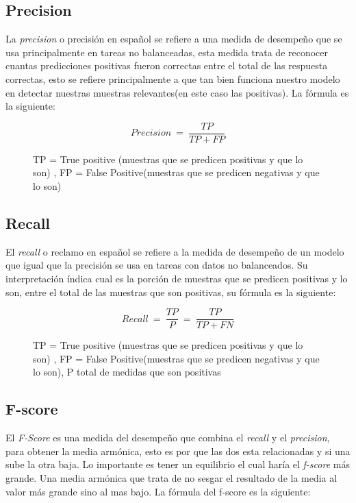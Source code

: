 \subsection{Precision}
	
\par La \textit{precision} o precisión en español se refiere a una medida de desempeño que se usa principalmente en tareas no balanceadas, esta medida trata de reconocer cuantas predicciones positivas fueron correctas entre el total de las respuesta correctas, esto se refiere principalmente a que tan bien funciona nuestro modelo en detectar nuestras muestras relevantes(en este caso las positivas). La fórmula es la siguiente: 
\begin{figure}[H]
    \centering
    \begin{equation*}
        Precision\ =\ \frac{TP}{TP+FP}    
    \end{equation*}
        \caption*{TP = True positive (muestras que se predicen positivas y que lo son) , FP = False Positive(muestras que se predicen negativas y que lo son)}
\end{figure}


\subsection{Recall}

\par El \textit{recall} o reclamo en español se refiere a la medida de desempeño de un modelo que igual que la precisión se usa en tareas con datos no balanceados. Su interpretación índica cual es la porción de muestras que se predicen positivas y lo son, entre el total de las muestras que son positivas, su fórmula es la siguiente:
	
	\begin{figure}[H]
    \centering
    \begin{equation*}
        Recall\ =\ \frac{TP}{P}\ =\ \frac{TP}{TP+FN}    
    \end{equation*}
        \caption*{TP = True positive (muestras que se predicen positivas y que lo son) , FP = False Positive(muestras que se predicen negativas y que lo son), P total de medidas que son positivas}
\end{figure}
	
\subsection{F-score}	

\par El \textit{F-Score} es una medida del desempeño que combina el \textit{recall} y el \textit{precision}, para obtener la media armónica, esto es por que las dos esta relacionadas y si una sube la otra baja. Lo importante es tener un equilibrio el cual haría el \textit{f-score} más grande. Una media armónica que trata de no sesgar el resultado de la media al valor más grande sino al mas bajo. La fórmula del f-score es la siguiente:

